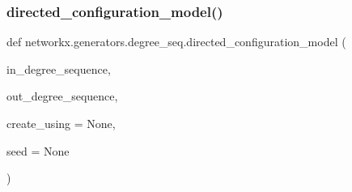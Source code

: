 \subsubsection{\texorpdfstring{directed\+\_\+configuration\+\_\+model()}{directed\_configuration\_model()}}
{\footnotesize\ttfamily def networkx.\+generators.\+degree\+\_\+seq.\+directed\+\_\+configuration\+\_\+model (\begin{DoxyParamCaption}\item[{}]{in\+\_\+degree\+\_\+sequence,  }\item[{}]{out\+\_\+degree\+\_\+sequence,  }\item[{}]{create\+\_\+using = {\ttfamily None},  }\item[{}]{seed = {\ttfamily None} }\end{DoxyParamCaption})}

